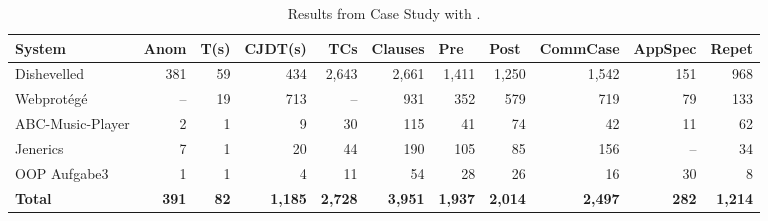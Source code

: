 \begin{table}
\centering
\caption{Results from Case Study with \contractjdoc{}.}
\label{tab:caseStudyResults}
\begin{adjustbox}{width=\textwidth}
\begin{tabular}{lrrrrrrrrrr} 
\toprule
 \textbf{System}  & \textbf{Anom} & \textbf{T(s)}  & \multicolumn{1}{l}{\textbf{CJDT}(s)} & \textbf{TCs}      & \textbf{Clauses}  & \multicolumn{1}{l}{\textbf{Pre}} & \multicolumn{1}{l}{\textbf{Post}} & \textbf{CommCase}  & \textbf{AppSpec}  & \textbf{Repet}    \\ 
\toprule
Dishevelled       & 381           & 59                & 434                                     & 2,643             & 2,661             & 1,411                              & 1,250                               & 1,542              & 151               & 968               \\
Webprotégé        & --             & 19                & 713                                     & --                 & 931               & 352                                & 579                                 & 719                & 79                & 133               \\
ABC-Music-Player  & 2             & 1                 & 9                                       & 30                & 115               & 41                                 & 74                                  & 42                 & 11                & 62                \\
Jenerics          & 7             & 1                 & 20                                      & 44                & 190               & 105                                & 85                                  & 156                & --                 & 34                \\
OOP Aufgabe3      & 1             & 1                 & 4                                       & 11                & 54                & 28                                 & 26                                  & 16                 & 30                & 8                 \\ 
\bottomrule
\textbf{ Total }  & \textbf{391}  & \textbf{82}       & \textbf{1,185}                          & \textbf{ 2,728 }  & \textbf{3,951}    & \multicolumn{1}{l}{\textbf{1,937}} & \multicolumn{1}{l}{\textbf{2,014}}  & \textbf{ 2,497 }   & \textbf{ 282 }    & \textbf{ 1,214}   \\
\bottomrule
\end{tabular}
\end{adjustbox}
\end{table}



